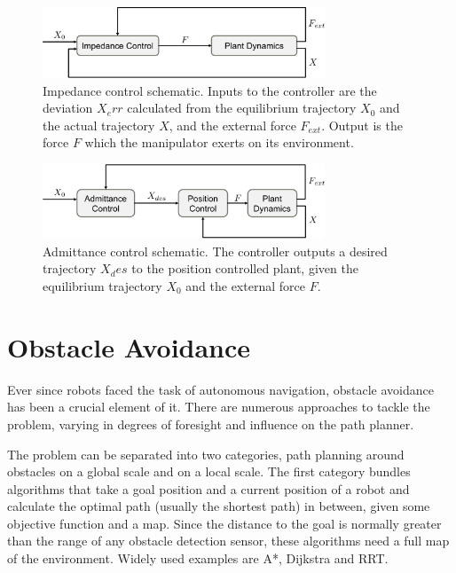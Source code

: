 \begin{figure}
   \centering
   \includegraphics[width=0.75\textwidth]{images/impedance_control_schematic.pdf}
   \caption{Impedance control schematic. Inputs to the controller are the deviation $X_err$ calculated from the equilibrium trajectory $X_0$ and the actual trajectory $X$, and the external force $F_{ext}$. Output is the force $F$ which the manipulator exerts on its environment.}
   \label{pics:impedance_control}
\end{figure}

\begin{figure}
   \centering
   \includegraphics[width=0.75\textwidth]{images/admittance_control_schematic.pdf}
   \caption{Admittance control schematic. The controller outputs a desired trajectory $X_des$ to the position controlled plant, given the equilibrium trajectory $X_0$ and the external force $F$.}
   \label{pics:admittance_control}
\end{figure}


\chapter{Obstacle Avoidance}
Ever since robots faced the task of autonomous navigation, obstacle avoidance has been a crucial element of it. There are numerous approaches to tackle the problem, varying in degrees of foresight and influence on the path planner.

The problem can be separated into two categories, path planning around obstacles on a global scale and on a local scale. The first category bundles algorithms that take a goal position and a current position of a robot and calculate the optimal path (usually the shortest path) in between, given some objective function and a map. Since the distance to the goal is normally greater than the range of any obstacle detection sensor, these algorithms need a full map of the environment. Widely used examples are A*, Dijkstra and RRT.

